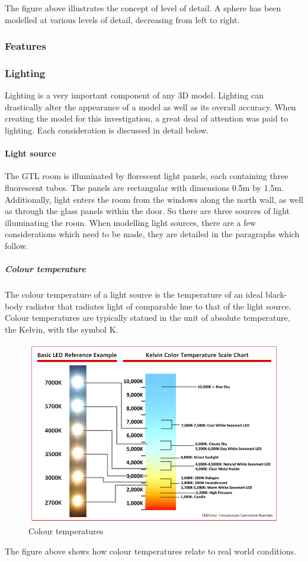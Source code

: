 \documentclass[11pt,a4paper]{report}
\begin{document}
			
			The figure above illustrates the concept of level of detail. A sphere has been modelled at various levels of detail, decreasing from left to right.
			
			\subsubsection{Features}
				
			\subsubsection{Lighting}
				Lighting is a very important component of any 3D model. Lighting can drastically alter the appearance of a model as well as its overall accuracy. When creating the model for this investigation, a great deal of attention was paid to lighting. Each consideration is discussed in detail below.
				
				\paragraph{Light source}
					The GTL room is illuminated by florescent light panels, each containing three fluorescent tubes. The panels are rectangular with dimensions 0.5m by 1.5m. Additionally, light enters the room from the windows along the north wall, as well as through the glass panels within the door. So there are three sources of light illuminating the room. When modelling light sources, there are a few considerations which need to be made, they are detailed in the paragraphs which follow.
					\subparagraph{Colour temperature}
						The colour temperature of a light source is the temperature of an ideal black-body radiator that radiates light of comparable hue to that of the light source. Colour temperatures are typically statued in the unit of absolute temperature, the Kelvin, with the symbol K.
						\begin{figure}[H]
							\centering
							\includegraphics[width=1\textwidth]{colour_temperature}
							\caption{Colour temperatures}
						\end{figure}
						The figure above shows how colour temperatures relate to real world conditions.
				
\end{document}
